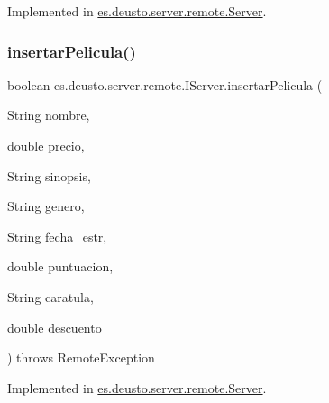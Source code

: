 Implemented in \mbox{\hyperlink{classes_1_1deusto_1_1server_1_1remote_1_1_server_ae4892ba5e855e921d156a4b49562424c}{es.\+deusto.\+server.\+remote.\+Server}}.

\mbox{\label{interfacees_1_1deusto_1_1server_1_1remote_1_1_i_server_aef2c6618c8d38cbd221c290875f37e69}} 
\subsubsection{\texorpdfstring{insertarPelicula()}{insertarPelicula()}}
{\footnotesize\ttfamily boolean es.\+deusto.\+server.\+remote.\+I\+Server.\+insertar\+Pelicula (\begin{DoxyParamCaption}\item[{String}]{nombre,  }\item[{double}]{precio,  }\item[{String}]{sinopsis,  }\item[{String}]{genero,  }\item[{String}]{fecha\+\_\+estr,  }\item[{double}]{puntuacion,  }\item[{String}]{caratula,  }\item[{double}]{descuento }\end{DoxyParamCaption}) throws Remote\+Exception}



Implemented in \mbox{\hyperlink{classes_1_1deusto_1_1server_1_1remote_1_1_server_a826b0343cb4dd20617cb7ee299de4171}{es.\+deusto.\+server.\+remote.\+Server}}.

\mbox{\label{interfacees_1_1deusto_1_1server_1_1remote_1_1_i_server_a41c5cae2283787ff002699c2ff1d5877}} 
